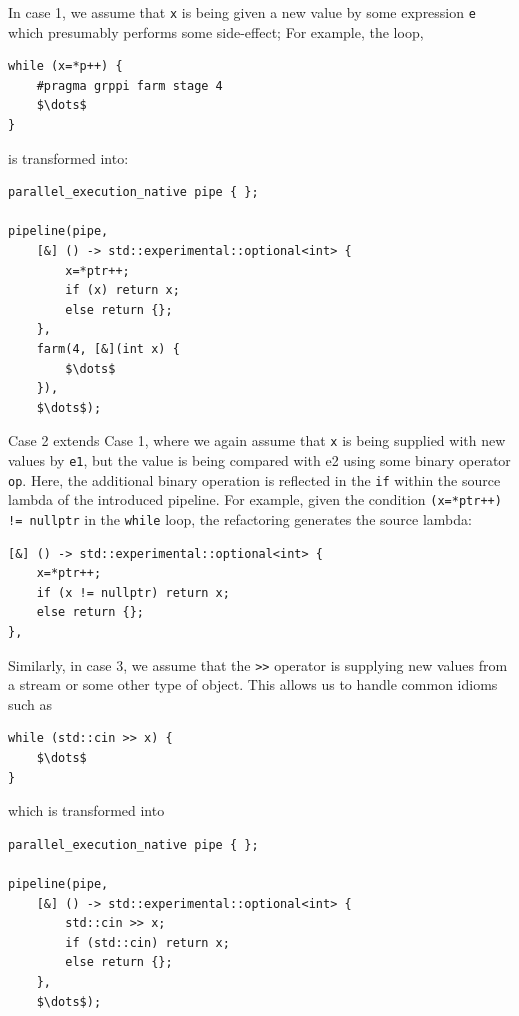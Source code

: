 \noindent
In case 1, we assume that \texttt{x} is being given a new value by some
expression \texttt{e} which presumably performs some side-effect;
For example, the loop,
% 
\begin{lstlisting}[mathescape]
while (x=*p++) {
    #pragma grppi farm stage 4
    $\dots$
}
\end{lstlisting}
% 
\noindent
is transformed into:
% 
\begin{lstlisting}[mathescape]
parallel_execution_native pipe { };

pipeline(pipe,
    [&] () -> std::experimental::optional<int> {
    	x=*ptr++;
    	if (x) return x;
    	else return {};
    },
    farm(4, [&](int x) {
        $\dots$
    }),
    $\dots$);
\end{lstlisting}
% 
Case 2 extends Case 1, where we again assume that \texttt{x} is being supplied with new
values by \texttt{e1}, but the value is being compared with e2 using some
binary operator \texttt{op}. Here, the additional binary operation is reflected in the \texttt{if} within the source lambda of the introduced pipeline. For example, given the condition \lstinline|(x=*ptr++) != nullptr| in the \texttt{while} loop, the refactoring generates the source lambda:
% 
\begin{lstlisting}[mathescape]
[&] () -> std::experimental::optional<int> {
	x=*ptr++;
	if (x != nullptr) return x;
	else return {};
},
\end{lstlisting}

% 
Similarly, in case 3, we assume that the \texttt{>>}
operator is supplying new values from a stream or some other type of
object. This allows us to handle common idioms such as
\begin{lstlisting}[mathescape]
while (std::cin >> x) {
    $\dots$
}
\end{lstlisting}
% 
\noindent
which is transformed into
% 
\begin{lstlisting}[mathescape]
parallel_execution_native pipe { };

pipeline(pipe,
	[&] () -> std::experimental::optional<int> {
		std::cin >> x;
		if (std::cin) return x;
		else return {};
	},
	$\dots$);
\end{lstlisting}

